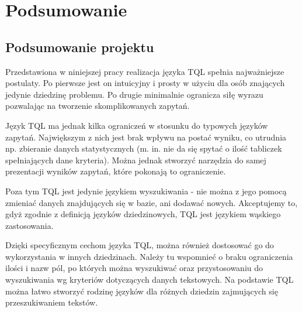 \chapter*{Podsumowanie}
% 

\section*{Podsumowanie projektu}
Przedstawiona w niniejszej pracy realizacja języka TQL spełnia najważniejsze postulaty. 
Po pierwsze jest on intuicyjny i prosty w użyciu dla osób znających jedynie dziedzinę problemu.
Po drugie minimalnie ogranicza siłę wyrazu pozwalając na tworzenie skomplikowanych zapytań.

Język TQL ma jednak kilka ograniczeń w stosunku do typowych języków zapytań. 
Największym z nich jest brak wpływu na postać wyniku, co utrudnia np. zbieranie danych statystycznych 
(m. in. nie da się spytać o ilość tabliczek spełniających dane kryteria). 
Można jednak stworzyć narzędzia do samej prezentacji wyników zapytań, które pokonają to ograniczenie. 

Poza tym TQL jest jedynie językiem wyszukiwania - nie można z jego pomocą zmieniać danych znajdujących się w bazie, 
 ani dodawać nowych. Akceptujemy to, gdyż zgodnie z definicją języków dziedzinowych, TQL jest językiem wąskiego zastosowania.

Dzięki specyficznym cechom języka TQL, można również dostosować go do wykorzystania w innych dziedzinach. 
Należy tu wspomnieć o braku ograniczenia ilości i nazw pól, po których można wyszukiwać oraz przystosowaniu 
do wyszukiwania wg kryteriów dotyczących danych tekstowych. 
Na podstawie TQL można łatwo stworzyć rodzinę języków dla różnych dziedzin zajmujących się przeszukiwaniem tekstów.

